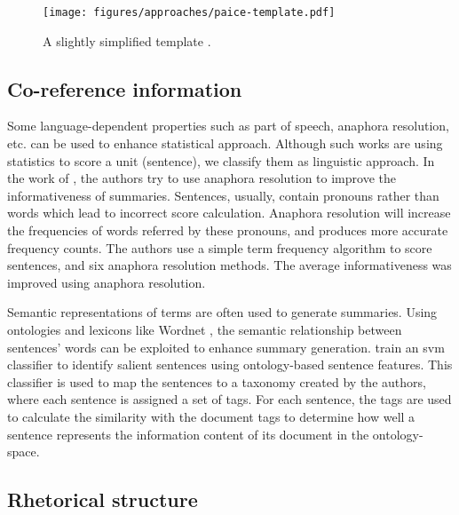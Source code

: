 \begin{figure}[!ht]
	\begin{center}
		\texttt{[image: figures/approaches/paice-template.pdf]} %
		\caption{A slightly simplified template \citep{81-paice}.}
		\label{fig:paice-template}
	\end{center}
\end{figure}


\subsection{Co-reference information}

Some language-dependent properties such as part of speech, anaphora resolution, etc. can be used to enhance statistical approach. 
Although such works are using statistics to score a unit (sentence), we classify them as linguistic approach.
In the work of \citet{07-orasan-stafford}, the authors try to use anaphora resolution to improve the  informativeness of summaries.
Sentences, usually, contain pronouns rather than words which lead to incorrect score calculation. 
Anaphora resolution will increase the frequencies of words referred by these pronouns, and produces more accurate frequency counts.
The authors use a simple term frequency algorithm to score sentences, and six anaphora resolution methods.
The average informativeness was improved using anaphora resolution.

Semantic representations of terms are often used to generate summaries. 
Using ontologies and lexicons like Wordnet \citep{95-miller}, the semantic relationship between sentences' words can be exploited to enhance summary generation.
\citet{08-hennig-al} train an \ac{svm} classifier to identify salient sentences using ontology-based sentence features. 
This classifier is used to map the sentences to a taxonomy created by the authors, where each sentence is assigned a set of tags.
For each sentence, the tags are used to calculate the similarity with the document tags to determine how well a sentence represents the information content of its document in the ontology-space.

\subsection{Rhetorical structure}

